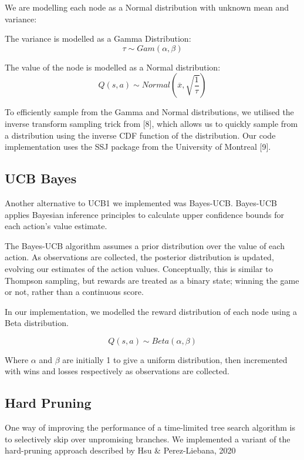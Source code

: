 \documentclass[conference]{IEEEtran}
\begin{document}
We are modelling each node as a Normal distribution with unknown mean and variance:

The variance is modelled as a Gamma Distribution:
\begin{equation}
\tau \sim  Gam(\alpha , \beta )
\end{equation}


The value of the node is modelled as a Normal distribution:
\begin{equation}
Q(s, a) \sim Normal(\overline{x}, \sqrt{\frac{1}{\tau }})
\end{equation}

To efficiently sample from the Gamma and Normal distributions, we utilised the inverse transform sampling trick from [8], which allows us to quickly sample from a distribution using the inverse CDF function of the distribution. Our code implementation uses the SSJ package from the University of Montreal [9].

\subsection{UCB Bayes}
Another alternative to UCB1 we implemented was Bayes-UCB. Bayes-UCB applies Bayesian inference principles to calculate upper confidence bounds for each action's value estimate.\cite{b8}

The Bayes-UCB algorithm assumes a prior distribution over the value of each action. As observations are collected, the posterior distribution is updated, evolving our estimates of the action values. 
Conceptually, this is similar to Thompson sampling, but rewards are treated as a binary state; winning the game or not, rather than a continuous score.


In our implementation, we modelled the reward distribution of each node using a Beta distribution.

\begin{equation}
Q(s, a) \sim  Beta(\alpha , \beta)
\end{equation}

Where ${\alpha}$ and ${\beta}$  are initially 1 to give a uniform distribution, then incremented with wins and losses respectively as observations are collected. 

\subsection{Hard Pruning}
One way of improving the performance of a time-limited tree search algorithm is to selectively skip over unpromising branches. We implemented a variant of the hard-pruning approach described by Hsu \& Perez-Liebana, 2020\cite{b9}
\end{document}
